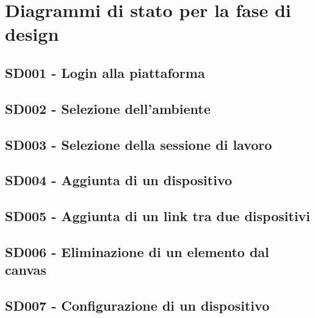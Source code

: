 \documentclass[../main.tex]{subfiles}
\begin{document}
\section{Diagrammi di stato per la fase di design}

\subsection{SD001 - Login alla piattaforma }
\figure[H]
\centering

\endfigure
\clearpage
\subsection{SD002 - Selezione dell'ambiente }
\figure[H]
\centering

\endfigure
\clearpage
\subsection{SD003 - Selezione della sessione di lavoro }
\figure[H]
\centering

\endfigure
\clearpage
\subsection{SD004 - Aggiunta di un dispositivo }
\figure[H]
\centering

\endfigure
\clearpage

\subsection{SD005 - Aggiunta di un link tra due dispositivi }
\figure[H]
\centering

\endfigure
\clearpage

\subsection{SD006 - Eliminazione di un elemento dal canvas }
\figure[H]
\centering

\endfigure
\clearpage

\subsection{SD007 - Configurazione di un dispositivo }
\figure[H]
\centering

\endfigure
\clearpage
\end{document}
